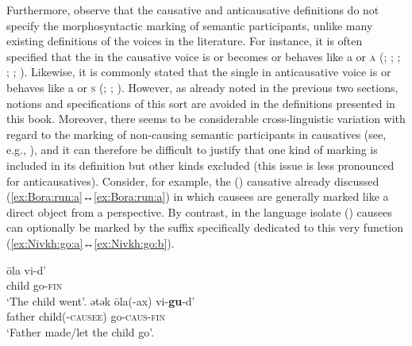 Furthermore, observe that the causative and anticausative definitions do not specify the morphosyntactic marking of semantic participants, unlike many existing definitions of the voices in the literature. For instance, it is often specified that the  in the causative voice is or becomes or behaves like a  or \textsc{a} (\citealt[31]{dixon:2000}; \citealt[13]{dixon:aikhenvald:2000}; \citealt[1137]{haspelmath:muller-bardey:2004}; \citealt[386]{kulikov:2010}; \citealt[122]{malchukov:2015}; \citeyear[412]{malchukov:2016}). Likewise, it is commonly stated that the single  in anticausative voice is or behaves like a  or \textsc{s} (\citealt[144]{kazenin:1994}; \citealt[7]{dixon:aikhenvald:2000}; \citealt[1132]{haspelmath:muller-bardey:2004}). However, as already noted in the previous two sections, notions and specifications of this sort are avoided in the definitions presented in this book. Moreover, there seems to be considerable cross-linguistic variation with regard to the marking of non-causing semantic participants in causatives (see, e.g., \citealt[45ff.]{dixon:2000}), and it can therefore be difficult to justify that one kind of marking is included in its definition but other kinds excluded (this issue is less pronounced for anticausatives). Consider, for example, the  () causative  already discussed (\ref{ex:Bora:run:a}↔\ref{ex:Bora:run:a}) in which causees are generally marked like a direct object from a  perspective. By contrast, in the language isolate  () causees can optionally be marked by the suffix  specifically dedicated to this very function (\ref{ex:Nivkh:go:a}↔\ref{ex:Nivkh:go:b}).

\ea {} \citep[78]{nedjalkov:al:1995}
\ea\label{ex:Nivkh:go:a}
	\gll	ōla	 vi-d’				 \\
			child	go-\textsc{fin}		\\
	\glt	‘The child went’.
\ex\label{ex:Nivkh:go:b}
	\gll	ətək	ōla(-ax)				 vi-\textbf{gu}-d’		 \\
			father	child(-\textsc{causee})	go-\textsc{caus-fin}	\\
	\glt	‘Father made/let the child go’.
	\z 
\z

